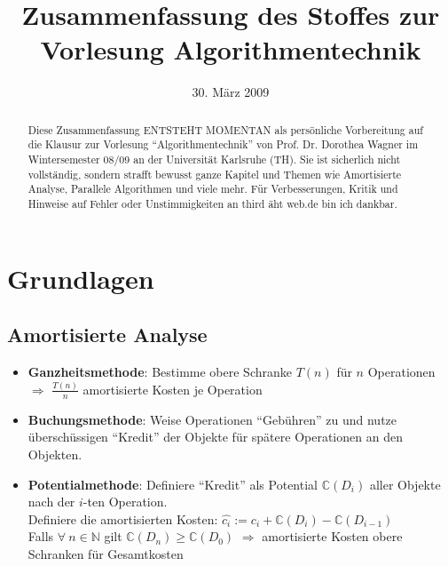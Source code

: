 \documentclass[a4paper,10pt]{scrartcl}
\title{Zusammenfassung des Stoffes zur Vorlesung Algorithmentechnik}
\date{30. März 2009}
\newcommand{\tbf}{\textbf}
\newcommand{\Ra}{\Rightarrow}
\newcommand{\nat}{\mathbb{N}}
\begin{document}
\maketitle

\begin{abstract}
Diese Zusammenfassung ENTSTEHT MOMENTAN als persönliche Vorbereitung auf die Klausur zur Vorlesung ``Algorithmentechnik'' von Prof. Dr. Dorothea Wagner im Wintersemester 08/09 an der Universität Karlsruhe (TH). Sie ist sicherlich nicht vollständig, sondern strafft bewusst ganze Kapitel und Themen wie Amortisierte Analyse, Parallele Algorithmen und viele mehr. Für Verbesserungen, Kritik und Hinweise auf Fehler oder Unstimmigkeiten an third äht web.de bin ich dankbar.
\end{abstract}

\setcounter{tocdepth}{1}
\tableofcontents

\newpage
\listofalgorithms


\newpage
\setcounter{section}{-1}
\section{Grundlagen}
\subsection{Amortisierte Analyse}
\begin{itemize}
 \item \tbf{Ganzheitsmethode}: Bestimme obere Schranke $T(n)$ für $n$ Operationen $\Ra$ $\frac{T(n)}{n}$ amortisierte Kosten je Operation
 \item \tbf{Buchungsmethode}: Weise Operationen ``Gebühren'' zu und nutze überschüssigen ``Kredit'' der Objekte für spätere Operationen an den Objekten.
 \item \tbf{Potentialmethode}: Definiere ``Kredit'' als Potential $\mathbb{C}(D_i)$ aller Objekte nach der $i$-ten Operation. \\
	Definiere die amortisierten Kosten: $\hat{c_i} := c_i + \mathbb{C}(D_i) - \mathbb{C}(D_{i-1})$ \\
	Falls $\forall \ n \in \nat$ gilt $\mathbb{C}(D_n) \geq \mathbb{C}(D_0)$ $\Ra$ amortisierte Kosten obere Schranken für Gesamtkosten
\end{itemize}
\end{document}
